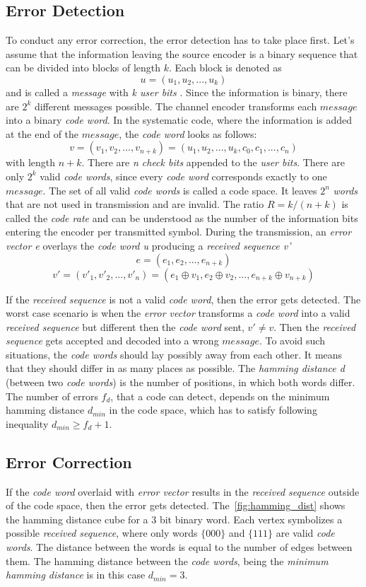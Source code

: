 \subsection{Error Detection}
To conduct any error correction, the error detection has to take place first. Let's assume that the information leaving the source encoder is a binary sequence that can be divided into blocks of length $k$. Each block is denoted as 
$$u=(u_1,u_2,...,u_k)$$ 
and is called a \textit{message} with \textit{k user bits} . Since the information is binary, there are $2^k$ different messages possible. The channel encoder transforms each $message$ into a binary \textit{code word}. In the systematic code, where the information is added at the end of the $message$, the \textit{code word} looks as follows:
$$v=(v_1,v_2,...,v_{n+k}) = (u_1,u_2,...,u_k, c_0,c_1,...,c_{n})$$ 
with length $n+k$. There are \textit{n check bits} appended to the \textit{user bits}. There are only $2^k$ valid \textit{code words}, since every \textit{code word} corresponds exactly to one $message$. The set of all valid \textit{code words} is called a code space. It leaves $2^n$ \textit{words} that are not used in transmission and are invalid. The ratio $R=k/(n+k)$ is called the \textit{code rate} and can be understood as the number of the information bits entering the encoder per transmitted symbol. During the transmission, an \textit{error vector e} overlays the \textit{code word u} producing a \textit{received sequence v'} 
$$e=(e_1,e_2,...,e_{n+k})$$ 
$$v'=(v'_1,v'_2,...,v'_n)= (e_1 \oplus v_1, e_2 \oplus v_2,...,e_{n+k} \oplus v_{n+k})$$

If the \textit{received sequence} is not a valid \textit{code word}, then the error gets detected. The worst case scenario is when the \textit{error vector} transforms a \textit{code word} into a valid \textit{received sequence} but different then the \textit{code word} sent, $v'\neq v$. Then the \textit{received sequence} gets accepted and decoded into a wrong $message$. To avoid such situations, the \textit{code words} should lay possibly away from each other. It means that they should differ in as many places as possible. The \textit{hamming distance d} (between two \textit{code words}) is the number of positions, in which both words differ. The number of errors $f_d$, that a code can detect, depends on the minimum hamming distance $d_{min}$ in the code space, which has to satisfy following inequality $d_{min} \geq f_d + 1$.
\subsection{Error Correction}
If the \textit{code word} overlaid with \textit{error vector} results in the \textit{received sequence} outside of the code space, then the error gets detected. The~\autoref{fig:hamming_dist} shows the hamming distance cube for a 3 bit binary word. Each vertex symbolizes a possible \textit{received sequence}, where only words $\{000\}$ and $\{111\}$ are valid \textit{code words}. The distance between the words is equal to the number of edges between them. The hamming distance between the \textit{code words}, being the \textit{minimum hamming distance} is in this case $d_{min}=3$.

